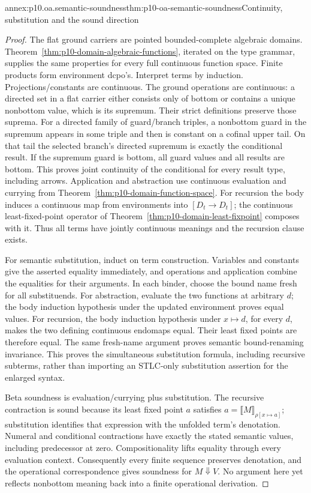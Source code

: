 \begin{annexitem}{annex:p10.oa.semantic-soundness}{thm:p10-oa-semantic-soundness}{Continuity, substitution and the sound direction}
\begin{proof}
The flat ground carriers are pointed bounded-complete algebraic domains.
Theorem~\ref{thm:p10-domain-algebraic-functions}, iterated on the type
grammar, supplies the same properties for every full continuous function
space. Finite products form environment dcpo's.
Interpret terms by induction. Projections/constants are continuous.
The ground operations are continuous: a directed set in a flat carrier
either consists only of bottom or contains a unique nonbottom value,
which is its supremum. Their strict definitions preserve those suprema.
For a directed family of guard/branch triples, a nonbottom guard in the
supremum appears in some triple and then is constant on a cofinal upper
tail. On that tail the selected branch's directed supremum is exactly
the conditional result. If the supremum guard is bottom, all guard
values and all results are bottom. This proves joint continuity of the
conditional for every result type, including arrows.
Application and abstraction use continuous evaluation and currying from
Theorem~\ref{thm:p10-domain-function-space}. For recursion the body
induces a continuous map from environments into \([D_t\to D_t]\);
the continuous least-fixed-point operator of
Theorem~\ref{thm:p10-domain-least-fixpoint} composes with it. Thus all
terms have jointly continuous meanings and the recursion clause exists.

For semantic substitution, induct on term construction. Variables and
constants give the asserted equality immediately, and operations and
application combine the equalities for their arguments. In each binder,
choose the bound name fresh for all substituends. For abstraction, evaluate
the two functions at arbitrary \(d\); the body induction hypothesis
under the updated environment proves equal values. For recursion,
the body induction hypothesis under \(x\mapsto d\), for every \(d\),
makes the two defining continuous endomaps equal. Their least fixed
points are therefore equal. The same fresh-name argument proves semantic
bound-renaming invariance. This proves the simultaneous substitution
formula, including recursive subterms, rather than importing an STLC-only
substitution assertion for the enlarged syntax.

Beta soundness is evaluation/currying plus substitution. The recursive
contraction is sound because its least fixed point \(a\) satisfies
\(a=\llbracket M\rrbracket_{\rho[x\mapsto a]}\); substitution identifies
that expression with the unfolded term's denotation. Numeral and
conditional contractions have exactly the stated semantic values,
including predecessor at zero. Compositionality lifts equality through
every evaluation context. Consequently every finite sequence preserves
denotation, and the operational correspondence gives soundness for
\(M\Downarrow V\). No argument here yet reflects nonbottom meaning
back into a finite operational derivation.
\end{proof}
\end{annexitem}

